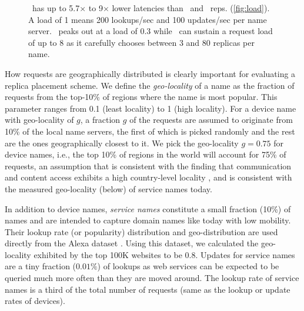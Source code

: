 \begin{figure}[t]
\caption{\small{\auspice\ has up to 5.7$\times$ to 9$\times$ lower latencies than \staticthree\ and \codons\ reps. (\ref{fig:load}). A load of 1 means 200 lookups/sec and 100 updates/sec per name server. \replicateall\ peaks out at a load of 0.3 while \auspice\ can sustain a request load of up to 8 as it carefully chooses between 3 and 80 replicas per name.}}
\vspace{-0.15in}
\label{fig:lookupupdate}
\end{figure}


How requests are geographically distributed is clearly important for evaluating a replica placement scheme.  We define the {\em geo-locality} of a name as the fraction of requests from the top-10\% of regions where the name is most popular. This parameter ranges from 0.1 (least locality) to 1 (high locality). For a device name with  geo-locality of $g$,  a fraction $g$ of the requests are assumed to originate from 10\% of the local name servers, the first of which is picked randomly and the rest are the ones geographically closest to it. We pick the geo-locality $g=0.75$ for device names, i.e., the top 10\% of regions in the world will account for 75\% of requests, an assumption that is consistent with the finding that communication and content access exhibits a high country-level locality \cite{twitter-www}, and is consistent with the measured geo-locality (below) of service names today.

In addition to device names, {\em service names} constitute a small fraction (10\%) of names and are intended to capture domain names like today with low mobility. Their lookup rate (or popularity) distribution and geo-distribution are used directly from the Alexa dataset \cite{alexa}. Using this dataset, we calculated the geo-locality exhibited by the top 100K websites to be 0.8. Updates for service names are a tiny fraction ($0.01\%$) of lookups as web services can be expected to be queried much more often than they are moved around. The lookup rate of service names is a third of the total number of requests (same as the lookup or update rates of devices).



